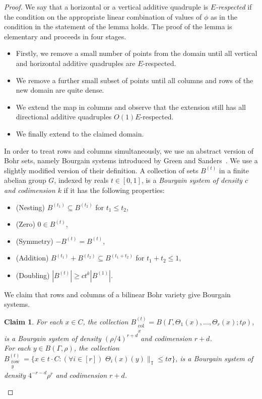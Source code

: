 \documentclass[a4paper,11pt]{article}
\numberwithin{theorem}{section}
\newtheorem{claim}[theorem]{Claim}
\theoremstyle{definition}
\newcommand{\on}[1]{
	\operatorname{#1}
}
\newcommand\ssk[1]{
	\substack{#1}
}
\begin{document}
\begin{proof} We say that a horizontal or a vertical additive quadruple is \textit{$E$-respected} if the condition on the appropriate linear combination of values of $\phi$ as in the condition in the statement of the lemma holds. The proof of the lemma is elementary and proceeds in four stages.

\begin{itemize}
    \item[\textbf{Step 1.}] Firstly, we remove a small number of points from the domain until all vertical and horizontal additive quadruples are $E$-respected.
    \item[\textbf{Step 2.}] We remove a further small subset of points until all columns and rows of the new domain are quite dense.
    \item[\textbf{Step 3.}] We extend the map in columns and observe that the extension still has all directional additive quadruples $O(1)E$-respected.
    \item[\textbf{Step 4.}] We finally extend to the claimed domain.
\end{itemize}

In order to treat rows and columns simultaneously, we use an abstract version of Bohr sets, namely Bourgain systems introduced by Green and Sanders~\cite{GreenSanders}. We use a slightly modified version of their definition. A collection of sets $B^{(t)}$ in a finite abelian group $G$, indexed by reals $t \in [0,1]$, is a \textit{Bourgain system of density $c$ and codimension $k$} if it has the following properties:
\begin{itemize}
    \item (Nesting) $B^{(t_1)} \subseteq B^{(t_2)}$ for $t_1 \leq t_2$,
    \item (Zero) $0 \in B^{(t)}$,
    \item (Symmetry) $-B^{(t)} = B^{(t)}$,
    \item (Addition) $B^{(t_1)} + B^{(t_2)} \subseteq B^{(t_1 + t_2)}$ for $t_1 + t_2 \leq 1$,
    \item (Doubling) $|B^{(t)}| \geq c t^k |B^{(1)}|$.
\end{itemize}

We claim that rows and columns of a bilinear Bohr variety give Bourgain systems.

\begin{claim}
    For each $x \in C$, the collection $B_{\ssk{\on{col}\\x}}^{(t)} = B(\Gamma, \Theta_1(x), \dots, \Theta_r(x); t\rho)$, is a Bourgain system of density $(\rho/4)^{r + d}$ and codimension $r + d$.\\
    For each $y \in B(\Gamma, \rho)$, the collection $B_{\ssk{\on{row}\\y}}^{(t)} = \{x \in t \cdot C :(\forall i \in [r])\,\, \Theta_i(x)(y)\|_{\mathbb{T}} \leq t \sigma \}$, is a Bourgain system of density $4^{-r-d}\rho^{r}$ and codimension $r + d$.\\
\end{claim}


\end{proof}
\end{document}
